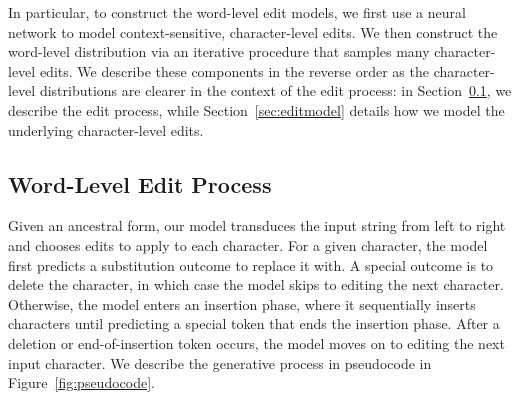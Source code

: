 \documentclass[11pt]{article}
\begin{document}
In particular, to construct the word-level edit models, we first use a neural network to model context-sensitive, character-level edits. We then construct the word-level distribution via an iterative procedure that samples many character-level edits. We describe these components in the reverse order as the character-level distributions are clearer in the context of the edit process: in Section~\ref{sec:editproc}, we describe the edit process, while Section~\ref{sec:editmodel} details how we model the underlying character-level edits.



\subsection{Word-Level Edit Process}
\label{sec:editproc}
Given an ancestral form, our model transduces the input string from left to right and chooses edits to apply to each character. For a given character, the model first predicts a substitution outcome to replace it with. A special outcome is to delete the character, in which case the model skips to editing the next character. Otherwise, the model enters an insertion phase, where it sequentially inserts characters until predicting a special token that ends the insertion phase. After a deletion or end-of-insertion token occurs, the model moves on to editing the next input character. We describe the generative process in pseudocode in Figure~\ref{fig:pseudocode}.
\end{document}

